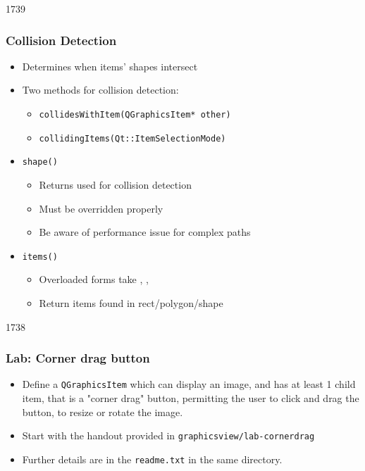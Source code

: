 \begin{slide}{1739}

\frametitle{Collision Detection}
\begin{itemize}
\item Determines when items' shapes intersect
\item Two methods for collision detection:
    \begin{itemize}
    \item \texttt{collidesWithItem(QGraphicsItem* other)}
    \item \texttt{collidingItems(Qt::ItemSelectionMode)}
    \end{itemize}
\item \texttt{shape()}
    \begin{itemize}
    \item Returns  used for collision detection
    \item Must be overridden properly
    \item Be aware of performance issue for complex paths
    \end{itemize}
\item \texttt{items()}
    \begin{itemize}
    \item Overloaded forms take , , 

    \item Return items found in rect/polygon/shape
    \end{itemize}
\end{itemize}

\end{slide}

\begin{slide}{1738}
\frametitle{Lab: Corner drag button}
\begin{itemize}
\item Define a \texttt{QGraphicsItem} which can display an image, and has at least 1 child item, that is a "corner drag" button, permitting the user to click and drag the button, to resize or rotate the image.
\item Start with the handout provided in \texttt{graphicsview/lab-cornerdrag}
\item Further details are in the \texttt{readme.txt} in the same directory.
\end{itemize}
\end{slide}


